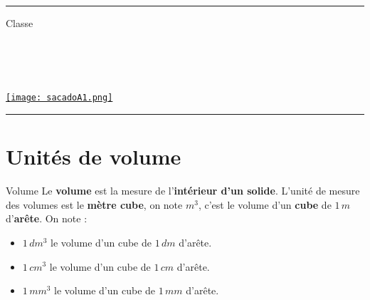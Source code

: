 \documentclass[a4paper,dvipsnames]{article}
\begin{document}

\fancyhead[C]{}
\hrule\medskip %
\begin{minipage}{0.295\textwidth} 
\raggedright
Classe \myClasse \hfill\\
\myDiscipline \hfill\\
\myParcours \hfill\\
\end{minipage}
\begin{minipage}{0.4\textwidth} 
\centering 
\scshape\huge
\textcolor{sacado_purple}{\myTitle} \\ 
\normalsize 
\end{minipage}
\begin{minipage}{0.295\textwidth} 
\raggedleft
\href{https://sacado.xyz/}{\texttt{[image: sacadoA1.png]}}
\end{minipage}
\medskip \hrule
\bigskip



\section{Unités de volume}

\begin{DefT}{Volume}
Le \textbf{volume} est la mesure de l'\textbf{intérieur d'un solide}. L'unité de mesure des volumes est le \textbf{mètre cube}, on note $m^3$, c'est le volume d'un \textbf{cube} de $1\,m$ d'\textbf{arête}. On note :
\begin{itemize}
\item $1\,dm^3$ le volume d'un cube de $1\,dm$ d'arête.
\item $1\,cm^3$ le volume d'un cube de $1\,cm$ d'arête.
\item $1\,mm^3$ le volume d'un cube de $1\,mm$ d'arête.
\end{itemize}
\end{DefT}
\end{document}
